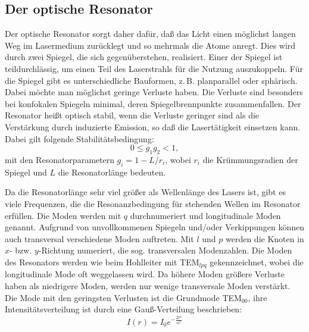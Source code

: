 \subsection{Der optische Resonator}
Der optische Resonator sorgt daher dafür, daß das Licht einen möglichst
langen Weg im Lasermedium zurücklegt und so mehrmals die Atome anregt.
Dies wird durch zwei Spiegel, die sich gegenüberstehen, realisiert.
Einer der Spiegel ist teildurchlässig, um einen Teil des Laserstrahls
für die Nutzung auszukoppeln.  Für die Spiegel gibt es unterschiedliche
Bauformen, z.\,B. planparallel oder sphärisch.  Dabei möchte man
möglichst geringe Verluste haben. Die Verluste sind besonders bei
konfokalen Spiegeln minimal, deren Spiegelbrennpunkte zusammenfallen.
Der Resonator heißt optisch stabil, wenn die Verluste geringer sind als
die Verstärkung durch induzierte Emission, so daß die Lasertätigkeit
einsetzen kann.  Dabei gilt folgende Stabilitätsbedingung:
\begin{equation}
  0 \le g_1 g_2 < 1,
\end{equation}
mit den Resonatorparametern $g_i = 1 - L/r_i$, wobei $r_i$ die
Krümmungsradien der Spiegel und $L$ die Resonatorlänge bedeuten.

Da die Resonatorlänge sehr viel größer als Wellenlänge des Lasers ist,
gibt es viele Frequenzen, die die Resonanzbedingung für stehenden Wellen
im Resonator erfüllen.  Die Moden werden mit $q$ durchnumeriert und
longitudinale Moden genannt.  Aufgrund von unvollkommenen Spiegeln
und/oder Verkippungen können auch transversal verschiedene Moden
auftreten. Mit $l$ und $p$ werden die Knoten in $x$- bzw. $y$-Richtung
numeriert, die sog. transversalen Modenzahlen.  Die Moden des Resonators
werden wie beim Hohlleiter mit TEM$_{lpq}$ gekennzeichnet, wobei die
longitudinale Mode oft weggelassen wird.  Da höhere Moden größere
Verluste haben als niedrigere Moden, werden nur wenige transversale
Moden verstärkt.  Die Mode mit den geringsten Verlusten ist die
Grundmode TEM$_{00}$, ihre Intensitätsverteilung ist durch eine
Gauß-Verteilung beschrieben:
\begin{equation}
  I(r) = I_0 e^{-\frac{2r^2}{w^2}}
\end{equation}
